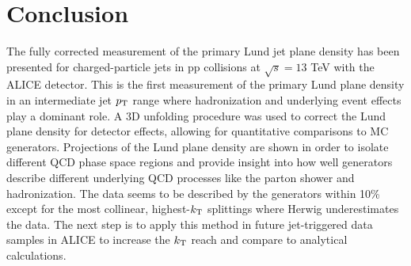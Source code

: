 \documentclass{PoS}
\begin{document}
\section{Conclusion}
The fully corrected measurement of the primary Lund jet plane density has been presented for charged-particle jets in pp collisions at $\sqrt{s}=13$ TeV with the ALICE detector. This is the first measurement of the primary Lund plane density in an intermediate jet $p_{\rm T}$ range where hadronization and underlying event effects play a dominant role.  A 3D unfolding procedure was used to correct the Lund plane density for detector effects, allowing for quantitative comparisons to MC generators. Projections of the Lund plane density are shown in order to isolate different QCD phase space regions and provide insight into how well generators describe different underlying QCD processes like the parton shower and hadronization. The data seems to be described by the generators within 10\% except for the most collinear, highest-$k_{\rm T}$ splittings where Herwig underestimates the data. 
The next step is to apply this method in future jet-triggered data samples in ALICE to increase the $k_{\rm T}$ reach and compare to analytical calculations. 






\end{document}

